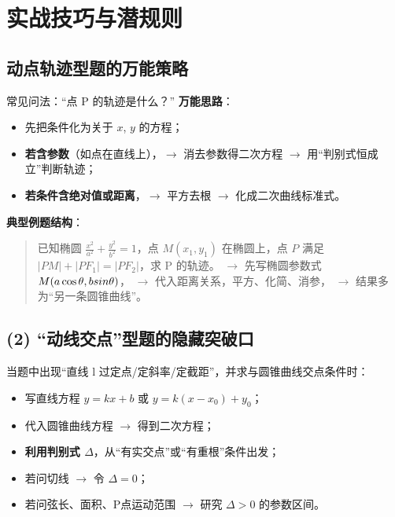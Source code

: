 \documentclass{article}
\begin{document}
	
	\section{实战技巧与潜规则}
	
	\subsection{动点轨迹型题的万能策略}
	
	常见问法：``点 P 的轨迹是什么？''
	\textbf{万能思路}：
	
	\begin{itemize}
		\item 先把条件化为关于 $x$, $y$ 的方程；
		\item \textbf{若含参数}（如点在直线上），$\rightarrow$ 消去参数得二次方程 $\rightarrow$ 用``判别式恒成立''判断轨迹；
		\item \textbf{若条件含绝对值或距离}，$\rightarrow$ 平方去根 $\rightarrow$ 化成二次曲线标准式。
	\end{itemize}
	
	\textbf{典型例题结构}：
	
	\begin{quote}
		已知椭圆 $\frac{x^2}{a^2}+\frac{y^2}{b^2}=1$，点 $M(x_1,y_1)$ 在椭圆上，点 $P$ 满足 $|PM|+|PF_1|=|PF_2|$，求 P 的轨迹。
		\newline$\rightarrow$ 先写椭圆参数式 $M(a\cos\theta,b\\sin\theta)$，
		\newline$\rightarrow$ 代入距离关系，平方、化简、消参，
		\newline$\rightarrow$ 结果多为``另一条圆锥曲线''。
	\end{quote}
	
	\subsection*{(2) ``动线交点''型题的隐藏突破口}
	
	当题中出现``直线 l 过定点/定斜率/定截距''，并求与圆锥曲线交点条件时：
	
	\begin{itemize}
		\item 写直线方程 $y=kx+b$ 或 $y=k(x-x_0)+y_0$；
		\item 代入圆锥曲线方程 $\rightarrow$ 得到二次方程；
		\item \textbf{利用判别式 $\Delta$}，从``有实交点''或``有重根''条件出发；
		\item 若问切线 $\rightarrow$ 令 $\Delta = 0$；
		\item 若问弦长、面积、P点运动范围 $\rightarrow$ 研究 $\Delta>0$ 的参数区间。
	\end{itemize}
	
\end{document}
